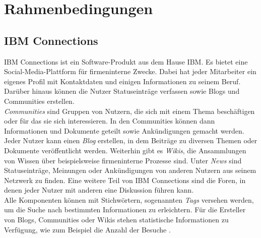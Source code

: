 

\chapter{Rahmenbedingungen}




\section{IBM Connections}
IBM Connections ist ein Software-Produkt aus dem Hause IBM. Es bietet eine Social-Media-Plattform für firmeninterne Zwecke. Dabei hat jeder Mitarbeiter ein eigenes Profil mit Kontaktdaten und einigen Informationen zu seinem Beruf. Darüber hinaus können die Nutzer Statuseinträge verfassen sowie Blogs und Communities erstellen. \\
\textit{Communities} sind Gruppen von Nutzern, die sich mit einem Thema beschäftigen oder für das sie sich interessieren. In den Communities können dann Informationen und Dokumente geteilt sowie Ankündigungen gemacht werden. Jeder Nutzer kann einen \textit{Blog} erstellen, in dem Beiträge zu diversen Themen oder Dokumente veröffentlicht werden. Weiterhin gibt es \textit{Wikis}, die Ansammlungen von Wissen über beispielsweise firmeninterne Prozesse sind. Unter \textit{News} sind Statuseinträge, Meinungen oder Ankündigungen von anderen Nutzern aus seinem Netzwerk zu finden. Eine weitere Teil von IBM Connections sind die Foren, in denen jeder Nutzer mit anderen eine Diskussion führen kann. \\
Alle Komponenten können mit Stichwörtern, sogenannten \textit{Tags} versehen werden, um die Suche nach bestimmten Informationen zu erleichtern. Für die Ersteller von Blogs, Communities oder Wikis stehen statistische Informationen zu Verfügung, wie zum Beispiel die Anzahl der Besuche \cite{conn3}.
\newpage


